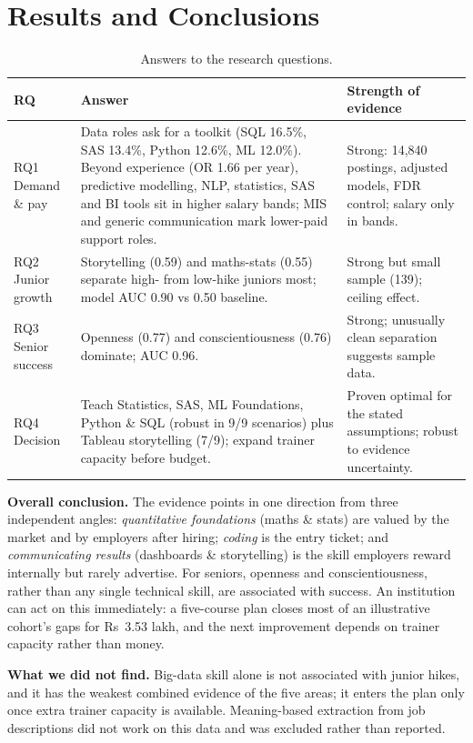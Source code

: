 \section{Results and Conclusions}\label{sec:results}

\begin{table}[H]\centering\small
\caption{Answers to the research questions.}\label{tab:answers}
\begin{tabularx}{\linewidth}{@{}L{2.1cm}Y L{3.8cm}@{}}
\toprule
RQ & Answer & Strength of evidence\\
\midrule
RQ1 Demand \& pay & Data roles ask for a toolkit (SQL 16.5\%, SAS 13.4\%, Python 12.6\%, ML 12.0\%).
Beyond experience (OR 1.66 per year), predictive modelling, NLP, statistics, SAS and BI tools sit in
higher salary bands; MIS and generic communication mark lower-paid support roles. &
Strong: 14,840 postings, adjusted models, FDR control; salary only in bands.\\
\addlinespace
RQ2 Junior growth & Storytelling (0.59) and maths-stats (0.55) separate high- from low-hike juniors
most; model AUC 0.90 vs 0.50 baseline. & Strong but small sample (139); ceiling effect.\\
\addlinespace
RQ3 Senior success & Openness (0.77) and conscientiousness (0.76) dominate; AUC 0.96. & Strong;
unusually clean separation suggests sample data.\\
\addlinespace
RQ4 Decision & Teach Statistics, SAS, ML Foundations, Python \& SQL (robust in 9/9 scenarios) plus
Tableau storytelling (7/9); expand trainer capacity before budget. & Proven optimal for the
stated assumptions; robust to evidence uncertainty.\\
\bottomrule
\end{tabularx}
\end{table}

\textbf{Overall conclusion.} The evidence points in one direction from three independent angles:
\emph{quantitative foundations} (maths \& stats) are valued by the market and by employers after
hiring; \emph{coding} is the entry ticket; and \emph{communicating results} (dashboards \&
storytelling) is the skill employers reward internally but rarely advertise. For seniors, openness
and conscientiousness, rather than any single technical skill, are associated with success. An
institution can act on this immediately: a five-course plan closes most of an illustrative cohort's
gaps for Rs~3.53 lakh, and the next improvement depends on trainer capacity rather than money.

\textbf{What we did not find.} Big-data skill alone is not associated with junior hikes, and it has
the weakest combined evidence of the five areas; it enters the plan only once extra trainer capacity
is available. Meaning-based extraction from job descriptions did not work on this data and was
excluded rather than reported.
